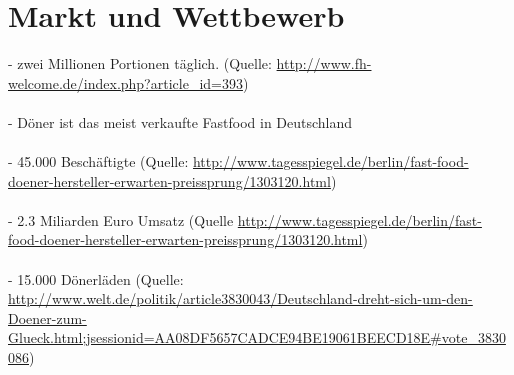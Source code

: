 
\section{Markt und Wettbewerb}
- zwei Millionen Portionen täglich. (Quelle: \url{http://www.fh-welcome.de/index.php?article_id=393})\\\\
- Döner ist das meist verkaufte Fastfood in Deutschland\\\\
- 45.000 Beschäftigte (Quelle: \url{http://www.tagesspiegel.de/berlin/fast-food-doener-hersteller-erwarten-preissprung/1303120.html})\\\\
- 2.3 Miliarden Euro Umsatz (Quelle \url{http://www.tagesspiegel.de/berlin/fast-food-doener-hersteller-erwarten-preissprung/1303120.html})\\\\
- 15.000 Dönerläden (Quelle: \url{http://www.welt.de/politik/article3830043/Deutschland-dreht-sich-um-den-Doener-zum-Glueck.html;jsessionid=AA08DF5657CADCE94BE19061BEECD18E#vote_3830086})\\\\
